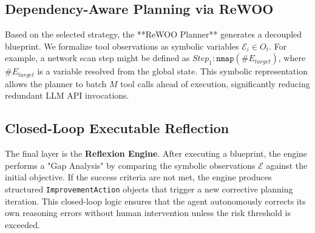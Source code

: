 \subsection{Dependency-Aware Planning via ReWOO}
Based on the selected strategy, the **ReWOO Planner** generates a decoupled blueprint. We formalize tool observations as symbolic variables $\mathcal{E}_i \in O_t$. For example, a network scan step might be defined as $Step_1: \texttt{nmap}(\#E_{target})$, where $\#E_{target}$ is a variable resolved from the global state. This symbolic representation allows the planner to batch $M$ tool calls ahead of execution, significantly reducing redundant LLM API invocations.

\subsection{Closed-Loop Executable Reflection}
The final layer is the \textbf{Reflexion Engine}. After executing a blueprint, the engine performs a "Gap Analysis" by comparing the symbolic observations $\mathcal{E}$ against the initial objective. If the success criteria are not met, the engine produces structured \texttt{ImprovementAction} objects that trigger a new corrective planning iteration. This closed-loop logic ensures that the agent autonomously corrects its own reasoning errors without human intervention unless the risk threshold is exceeded.



